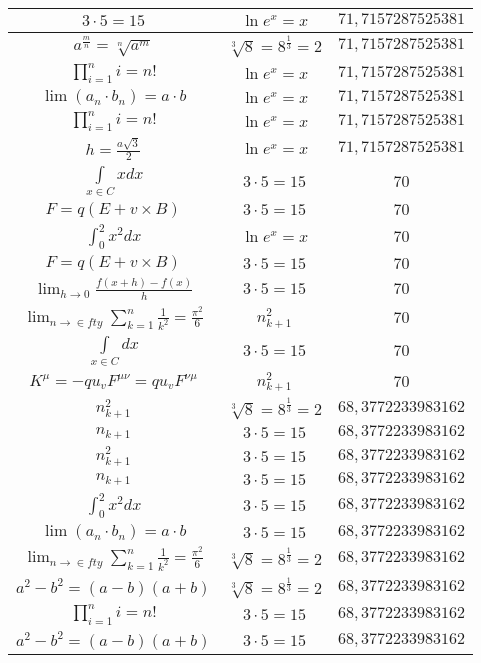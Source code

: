 \documentclass{article}
\begin{document}
\begin{flushleft}
\begin{longtable}{|c|c|c|}
$3\cdot 5=15$ & $\ln e^x=x$ & $71,7157287525381$ \\ \hline 
$a^{\frac{m}{n}}=\sqrt[n]{a^{m}}$ & $\sqrt[3]{8}=8^{\frac{1}{3}}=2$ & $71,7157287525381$ \\ \hline 
$\prod_{i=1}^ni=n!$ & $\ln e^x=x$ & $71,7157287525381$ \\ \hline 
$\lim\left(a_n\cdot b_n\right)=a\cdot b$ & $\ln e^x=x$ & $71,7157287525381$ \\ \hline 
$\prod_{i=1}^ni=n!$ & $\ln e^x=x$ & $71,7157287525381$ \\ \hline 
$h=\frac{a\sqrt{3}}{2}$ & $\ln e^x=x$ & $71,7157287525381$ \\ \hline 
$\int \limits_{x\in C}xdx$ & $3\cdot 5=15$ & $70$ \\ \hline 
$F=q\left(E+v\times B\right)$ & $3\cdot 5=15$ & $70$ \\ \hline 
$\int _0^2x^2dx$ & $\ln e^x=x$ & $70$ \\ \hline 
$F=q\left(E+v\times B\right)$ & $3\cdot 5=15$ & $70$ \\ \hline 
$\lim_{h\to0}\frac{f(x+h)-f(x)}{h}$ & $3\cdot 5=15$ & $70$ \\ \hline 
$\lim_{n\to\in fty}\sum_{k=1}^n\frac{1}{k^2}=\frac{\pi^2}{6}$ & $n_{k+1}^2$ & $70$ \\ \hline 
$\int \limits_{x\in C}dx$ & $3\cdot 5=15$ & $70$ \\ \hline 
$K^\mu=-qu_vF^{\mu\nu}=qu_vF^{\nu\mu}$ & $n_{k+1}^2$ & $70$ \\ \hline 
$n_{k+1}^2$ & $\sqrt[3]{8}=8^{\frac{1}{3}}=2$ & $68,3772233983162$ \\ \hline 
$n_{k+1}$ & $3\cdot 5=15$ & $68,3772233983162$ \\ \hline 
$n_{k+1}^2$ & $3\cdot 5=15$ & $68,3772233983162$ \\ \hline 
$n_{k+1}$ & $3\cdot 5=15$ & $68,3772233983162$ \\ \hline 
$\int _0^2x^2dx$ & $3\cdot 5=15$ & $68,3772233983162$ \\ \hline 
$\lim\left(a_n\cdot b_n\right)=a\cdot b$ & $3\cdot 5=15$ & $68,3772233983162$ \\ \hline 
$\lim_{n\to\in fty}\sum_{k=1}^n\frac{1}{k^2}=\frac{\pi^2}{6}$ & $\sqrt[3]{8}=8^{\frac{1}{3}}=2$ & $68,3772233983162$ \\ \hline 
$a^2-b^2=(a-b)(a+b)$ & $\sqrt[3]{8}=8^{\frac{1}{3}}=2$ & $68,3772233983162$ \\ \hline 
$\prod_{i=1}^ni=n!$ & $3\cdot 5=15$ & $68,3772233983162$ \\ \hline 
$a^2-b^2=(a-b)(a+b)$ & $3\cdot 5=15$ & $68,3772233983162$ \\ \hline 

\end{longtable}
\end{flushleft}
\end{document}
